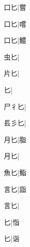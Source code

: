 \begin{multicols}{2}
{{口匕}\mktsJzrVerticalBar{}{\cjk{}{\cnsym{}　}{\cnsym{}　}{\cnsym{}　}}|{\cjk{}嘗}\par
{口匕}|{\cjk{}嚐}\par
{口匕}|{\cjk{}鱨}\par
{\cjk{}{\cnsym{}　}虫匕}\mktsJzrVerticalBar{}{\cjk{}{\cnsym{}　}{\cnsym{}　}{\cnsym{}　}}|{}\par
{\cjk{}{\cnsym{}　}片匕}\mktsJzrVerticalBar{}{\cjk{}{\cnsym{}　}{\cnsym{}　}{\cnsym{}　}}|{}\par
{匕}\mktsJzrVerticalBar{}{\cjk{}{\cnsym{}　}{\cnsym{}　}{\cnsym{}　}}|{}\par
{\cjk{}尸{彳}匕}\mktsJzrVerticalBar{}{\cjk{}{\cnsym{}　}{\cnsym{}　}{\cnsym{}　}}|{}\par
{\cjk{}镸彡匕}\mktsJzrVerticalBar{}{\cjk{}{\cnsym{}　}{\cnsym{}　}{\cnsym{}　}}|{}\par
{\cjk{}{\cnsym{}　}月匕}\mktsJzrVerticalBar{}{\cjk{}{\cnsym{}　}{\cnsym{}　}{\cnsym{}　}}|{\cjk{}脂}\par
{月匕}\mktsJzrVerticalBar{}{\cjk{}{\cnsym{}　}{\cnsym{}　}{\cnsym{}　}}|{}\par
{\cjk{}{\cnsym{}　}魚匕}\mktsJzrVerticalBar{}{\cjk{}{\cnsym{}　}{\cnsym{}　}{\cnsym{}　}}|{\cjk{}鮨}\par
{\cjk{}{\cnsym{}　}言匕}\mktsJzrVerticalBar{}{\cjk{}{\cnsym{}　}{\cnsym{}　}{\cnsym{}　}}|{\cjk{}詣}\par
{言匕}\mktsJzrVerticalBar{}{\cjk{}{\cnsym{}　}{\cnsym{}　}{\cnsym{}　}}|{}\par
{匕}\mktsJzrVerticalBar{}{\cjk{}{\cnsym{}　}{\cnsym{}　}{\cnsym{}　}}|{\cjk{}恉}\par
{匕}\mktsJzrVerticalBar{}{\cjk{}{\cnsym{}　}{\cnsym{}　}{\cnsym{}　}}|{\cjk{}诣}\par
}
\end{multicols}
